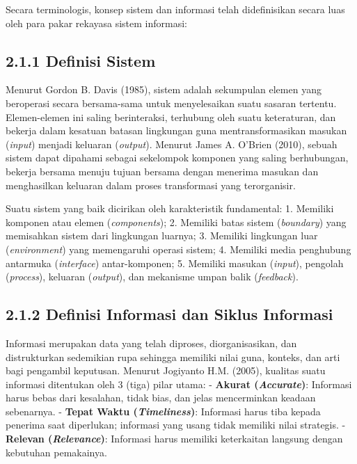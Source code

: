 \documentclass[
  indonesian,
  12pt,
]{report}
\begin{document}
Secara terminologis, konsep sistem dan informasi telah didefinisikan
secara luas oleh para pakar rekayasa sistem informasi:

\subsection{2.1.1 Definisi Sistem}\label{definisi-sistem}

Menurut Gordon B. Davis (1985), sistem adalah sekumpulan elemen yang
beroperasi secara bersama-sama untuk menyelesaikan suatu sasaran
tertentu. Elemen-elemen ini saling berinteraksi, terhubung oleh suatu
keteraturan, dan bekerja dalam kesatuan batasan lingkungan guna
mentransformasikan masukan (\emph{input}) menjadi keluaran
(\emph{output}). Menurut James A. O'Brien (2010), sebuah sistem dapat
dipahami sebagai sekelompok komponen yang saling berhubungan, bekerja
bersama menuju tujuan bersama dengan menerima masukan dan menghasilkan
keluaran dalam proses transformasi yang terorganisir.

Suatu sistem yang baik dicirikan oleh karakteristik fundamental: 1.
Memiliki komponen atau elemen (\emph{components}); 2. Memiliki batas
sistem (\emph{boundary}) yang memisahkan sistem dari lingkungan luarnya;
3. Memiliki lingkungan luar (\emph{environment}) yang memengaruhi
operasi sistem; 4. Memiliki media penghubung antarmuka
(\emph{interface}) antar-komponen; 5. Memiliki masukan (\emph{input}),
pengolah (\emph{process}), keluaran (\emph{output}), dan mekanisme umpan
balik (\emph{feedback}).

\subsection{2.1.2 Definisi Informasi dan Siklus
Informasi}\label{definisi-informasi-dan-siklus-informasi}

Informasi merupakan data yang telah diproses, diorganisasikan, dan
distrukturkan sedemikian rupa sehingga memiliki nilai guna, konteks, dan
arti bagi pengambil keputusan. Menurut Jogiyanto H.M. (2005), kualitas
suatu informasi ditentukan oleh 3 (tiga) pilar utama: - \textbf{Akurat
(\emph{Accurate})}: Informasi harus bebas dari kesalahan, tidak bias,
dan jelas mencerminkan keadaan sebenarnya. - \textbf{Tepat Waktu
(\emph{Timeliness})}: Informasi harus tiba kepada penerima saat
diperlukan; informasi yang usang tidak memiliki nilai strategis. -
\textbf{Relevan (\emph{Relevance})}: Informasi harus memiliki
keterkaitan langsung dengan kebutuhan pemakainya.
\end{document}
